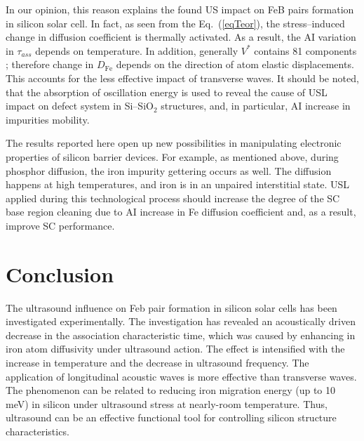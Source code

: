 \documentclass[sn-mathphys]{sn-jnl}%
\theoremstyle{thmstyleone}%
\theoremstyle{thmstyletwo}%
\theoremstyle{thmstylethree}%
\begin{document}
In our opinion, this reason explains the found US impact on FeB pairs formation in silicon solar cell.
In fact, as seen from the Eq.~(\ref{eqTeor}), the stress--induced change in diffusion coefficient is 
thermally  activated. 
As a result, the AI variation in $\tau_{ass}$ depends on temperature.
In addition, generally $V^*$ contains 81 components \cite{AZIZ2001};
therefore change in $D_\mathrm{Fe}$ depends on the direction of atom elastic displacements. 
This accounts for the less effective impact of transverse waves. 
It should be noted, that the absorption of oscillation energy is used \cite{GORB2020,UST:Medvid} 
to reveal the cause of USL impact on defect system in Si--SiO$_2$ structures, 
and, in particular, AI increase in impurities mobility.

The results reported here open up new possibilities in manipulating 
electronic properties of silicon barrier devices. 
For example, as mentioned above, during phosphor diffusion, 
the iron impurity gettering occurs as well. 
The diffusion happens at high temperatures, and iron is in an unpaired interstitial state.
USL applied during this technological process should increase 
the degree of the SC base region cleaning due to AI increase 
in Fe diffusion coefficient and, as a result, improve SC performance.

\section{Conclusion}

The ultrasound influence on Feb pair formation in silicon solar cells has been investigated experimentally. 
The investigation has revealed an acoustically driven decrease in the association characteristic time, 
which was caused by enhancing in iron atom diffusivity under ultrasound action.
The effect is intensified with the increase in temperature and the decrease in ultrasound frequency.
The application of longitudinal acoustic waves is more effective than transverse waves.
The phenomenon can be related to reducing iron migration energy (up to 10 meV) in silicon 
under ultrasound stress at nearly-room temperature. 
Thus, ultrasound can be an effective functional tool for controlling silicon structure characteristics.


\backmatter


%
\end{document}
